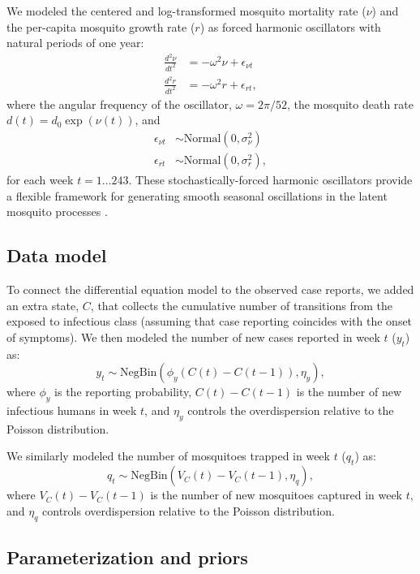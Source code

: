 \documentclass[10pt,letterpaper]{article}
\begin{document}
We modeled the centered and log-transformed mosquito mortality rate ($\nu$) and the per-capita mosquito growth rate ($r$) as forced harmonic oscillators with natural periods of one year:
\begin{align}
\frac{d^2\nu}{dt^2} &= -\omega^2 \nu + \epsilon_{\nu t}\\
\frac{d^2 r}{dt^2} &= -\omega^2 r + \epsilon_{rt},
\end{align}
where the angular frequency of the oscillator, $\omega = 2\pi / 52$, the mosquito death rate $d(t) = d_0 \exp(\nu(t))$, and
\begin{align}
\epsilon_{\nu t} & \sim \text{Normal}(0, \sigma^2_{\nu})\\
\epsilon_{rt} & \sim \text{Normal}(0, \sigma^2_r),
\end{align}
for each week $t = 1 \dots 243$.
These stochastically-forced harmonic oscillators provide a flexible framework for generating smooth seasonal oscillations in the latent mosquito processes \cite{Ramsay2017}.

\subsection*{Data model}

To connect the differential equation model to the observed case reports, we added an extra state, $C$, that collects the cumulative number of transitions from the exposed to infectious class (assuming that case reporting coincides with the onset of symptoms).
We then modeled the number of new cases reported in week $t$ ($y_t$) as:
\begin{equation}
y_t  \sim \text{NegBin}(\phi_y (C(t) - C(t-1)), \eta_y),
\end{equation}
where $\phi_y$ is the reporting probability, $C(t) - C(t-1)$ is the number of new infectious humans in week $t$, and $\eta_y$ controls the overdispersion relative to the Poisson distribution.

We similarly modeled the number of mosquitoes trapped in week $t$ ($q_t$) as:
\begin{equation}
q_t \sim \text{NegBin}(V_{C}(t) - V_{C}(t-1), \eta_q),
\end{equation}
where $V_{C}(t) - V_{C}(t-1)$ is the number of new mosquitoes captured in week $t$, and $\eta_q$ controls overdispersion relative to the Poisson distribution.

\subsection*{Parameterization and priors}
\end{document}
